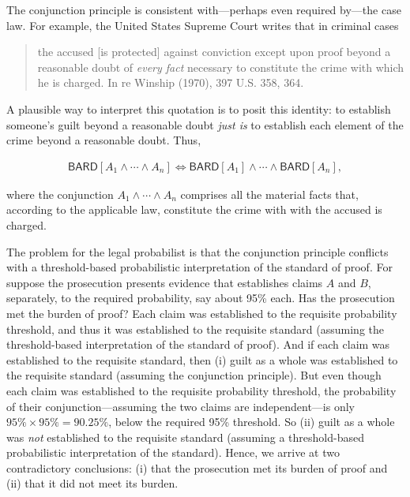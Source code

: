 \documentclass[10pt,dvipsnames,enabledeprecatedfontcommands]{scrartcl}
\newcommand{\et}{\wedge}
\begin{document}
The conjunction principle is consistent with---perhaps even required
by---the case law. For example, the United States Supreme Court writes
that in criminal cases

\begin{quote}
the accused [is protected] against conviction except upon proof beyond a reasonable doubt of \textit{every fact} necessary to constitute the crime with which he is charged. In re Winship (1970), 397 U.S. 358, 364. 
\end{quote}

\noindent A plausible way to interpret this quotation is to posit this
identity: to establish someone's guilt beyond a reasonable doubt
\textit{just is} to establish each element of the crime beyond a
reasonable doubt. Thus,

\begin{align*}\mathsf{BARD}[A_1 \wedge \cdots \wedge A_n] \Leftrightarrow \mathsf{BARD}[A_1] \wedge \cdots \wedge \mathsf{BARD}[A_n],
\end{align*}

\noindent where the conjunction \(A_1 \et \cdots \et A_n\) comprises all
the material facts that, according to the applicable law, constitute the
crime with with the accused is charged.

The problem for the legal probabilist is that the conjunction principle
conflicts with a threshold-based probabilistic interpretation of the
standard of proof. For suppose the prosecution presents evidence that
establishes claims \(A\) and \(B\), separately, to the required
probability, say about 95\% each. Has the prosecution met the burden of
proof? Each claim was established to the requisite probability
threshold, and thus it was established to the requisite standard
(assuming the threshold-based interpretation of the standard of proof).
And if each claim was established to the requisite standard, then (i)
guilt as a whole was established to the requisite standard (assuming the
conjunction principle). But even though each claim was established to
the requisite probability threshold, the probability of their
conjunction---assuming the two claims are independent---is only
\(95\%\times95\%=90.25\%\), below the required 95\% threshold. So (ii)
guilt as a whole was \textit{not} established to the requisite standard
(assuming a threshold-based probabilistic interpretation of the
standard). Hence, we arrive at two contradictory conclusions: (i) that
the prosecution met its burden of proof and (ii) that it did not meet
its burden.
\end{document}
